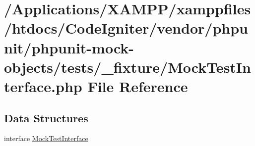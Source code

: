 \hypertarget{_mock_test_interface_8php}{}\section{/\+Applications/\+X\+A\+M\+P\+P/xamppfiles/htdocs/\+Code\+Igniter/vendor/phpunit/phpunit-\/mock-\/objects/tests/\+\_\+fixture/\+Mock\+Test\+Interface.php File Reference}
\label{_mock_test_interface_8php}
\subsection*{Data Structures}
\begin{DoxyCompactItemize}
\item 
interface \mbox{\hyperlink{interface_mock_test_interface}{Mock\+Test\+Interface}}
\end{DoxyCompactItemize}
